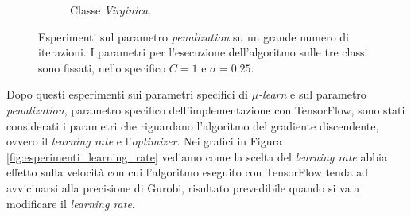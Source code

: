 \documentclass[a4paper,12pt]{report}
\begin{document}
\begin{figure}[H]
\begin{subfigure}{\textwidth}
        \caption{Classe \textit{Virginica}.}
        \label{subfig:Virginica_diffPen_10k}
    \end{subfigure}
    \caption{Esperimenti sul parametro \textit{penalization} su un grande numero di iterazioni. I parametri per l'esecuzione dell'algoritmo sulle tre classi sono fissati, nello specifico $C=1$ e $\sigma=0.25$.}
    \label{fig:esperimenti_penalization_10k}
\end{figure}

\noindent Dopo questi esperimenti sui parametri specifici di \textit{$\mu$-learn} e sul parametro \textit{penalization}, parametro specifico dell'implementazione con TensorFlow, sono stati considerati i parametri che riguardano l'algoritmo del gradiente discendente, ovvero il \textit{learning rate} e l'\textit{optimizer}. Nei grafici in Figura \ref{fig:esperimenti_learning_rate} vediamo come la scelta del \textit{learning rate} abbia effetto sulla velocità con cui l'algoritmo eseguito con TensorFlow tenda ad avvicinarsi alla precisione di Gurobi, risultato prevedibile quando si va a modificare il \textit{learning rate}.
\end{document}
